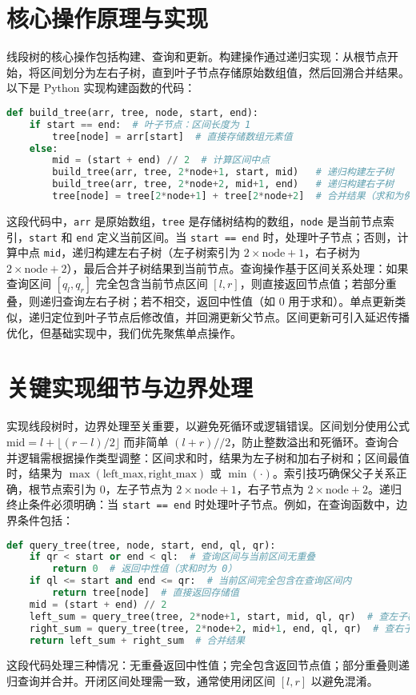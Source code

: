 \chapter{核心操作原理与实现}
线段树的核心操作包括构建、查询和更新。构建操作通过递归实现：从根节点开始，将区间划分为左右子树，直到叶子节点存储原始数组值，然后回溯合并结果。以下是 Python 实现构建函数的代码：\par
\begin{lstlisting}[language=python]
def build_tree(arr, tree, node, start, end):
    if start == end:  # 叶子节点：区间长度为 1
        tree[node] = arr[start]  # 直接存储数组元素值
    else:
        mid = (start + end) // 2  # 计算区间中点
        build_tree(arr, tree, 2*node+1, start, mid)   # 递归构建左子树
        build_tree(arr, tree, 2*node+2, mid+1, end)   # 递归构建右子树
        tree[node] = tree[2*node+1] + tree[2*node+2]  # 合并结果（求和为例）
\end{lstlisting}
这段代码中，\texttt{arr} 是原始数组，\texttt{tree} 是存储树结构的数组，\texttt{node} 是当前节点索引，\texttt{start} 和 \texttt{end} 定义当前区间。当 \texttt{start == end} 时，处理叶子节点；否则，计算中点 \texttt{mid}，递归构建左右子树（左子树索引为 $2 \times \text{node} + 1$，右子树为 $2 \times \text{node} + 2$），最后合并子树结果到当前节点。查询操作基于区间关系处理：如果查询区间 $[q_l, q_r]$ 完全包含当前节点区间 $[l, r]$，则直接返回节点值；若部分重叠，则递归查询左右子树；若不相交，返回中性值（如 0 用于求和）。单点更新类似，递归定位到叶子节点后修改值，并回溯更新父节点。区间更新可引入延迟传播优化，但基础实现中，我们优先聚焦单点操作。\par
\chapter{关键实现细节与边界处理}
实现线段树时，边界处理至关重要，以避免死循环或逻辑错误。区间划分使用公式 $\text{mid} = l + \lfloor (r - l) / 2 \rfloor$ 而非简单 $(l + r) // 2$，防止整数溢出和死循环。查询合并逻辑需根据操作类型调整：区间求和时，结果为左子树和加右子树和；区间最值时，结果为 $\max(\text{left\_max}, \text{right\_max})$ 或 $\min(\cdot)$。索引技巧确保父子关系正确，根节点索引为 0，左子节点为 $2 \times \text{node} + 1$，右子节点为 $2 \times \text{node} + 2$。递归终止条件必须明确：当 \texttt{start == end} 时处理叶子节点。例如，在查询函数中，边界条件包括：\par
\begin{lstlisting}[language=python]
def query_tree(tree, node, start, end, ql, qr):
    if qr < start or end < ql:  # 查询区间与当前区间无重叠
        return 0  # 返回中性值（求和时为 0）
    if ql <= start and end <= qr:  # 当前区间完全包含在查询区间内
        return tree[node]  # 直接返回存储值
    mid = (start + end) // 2
    left_sum = query_tree(tree, 2*node+1, start, mid, ql, qr)  # 查左子树
    right_sum = query_tree(tree, 2*node+2, mid+1, end, ql, qr)  # 查右子树
    return left_sum + right_sum  # 合并结果
\end{lstlisting}
这段代码处理三种情况：无重叠返回中性值；完全包含返回节点值；部分重叠则递归查询并合并。开闭区间处理需一致，通常使用闭区间 $[l, r]$ 以避免混淆。\par
